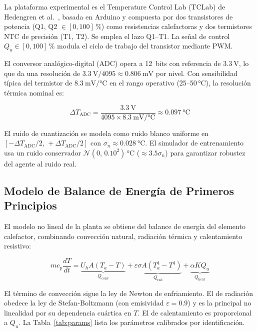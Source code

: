 \documentclass[processes,article,submit,moreauthors,pdftex]{Definitions/mdpi}
\newcommand{\Qu}{Q_u}
\begin{document}
La plataforma experimental es el Temperature Control Lab (TCLab) de
Hedengren et al.\ \cite{Hedengren2019}, basada en Arduino y compuesta por
dos transistores de potencia (Q1, Q2 $\in [0, 100]\,\%$) como resistencias
calefactoras y dos termistores NTC de precisión (T1, T2). Se emplea el
lazo Q1--T1. La señal de control $\Qu \in [0, 100]\,\%$ modula el ciclo de
trabajo del transistor mediante PWM.

El conversor analógico-digital (ADC) opera a 12~bits con referencia de
$\SI{3.3}{\V}$, lo que da una resolución de $\SI{3.3}{\V}/4095 \approx
\SI{0.806}{\milli\V}$ por nivel. Con sensibilidad típica del termistor de
$\SI{8.3}{\milli\V\per\celsius}$ en el rango operativo (25--50\,°C), la
resolución térmica nominal es:

\begin{equation}
  \label{eq:adc_resolution}
  \Delta T_{\mathrm{ADC}}
  = \frac{\SI{3.3}{\V}}{4095 \times \SI{8.3}{\milli\V\per\celsius}}
  \approx \SI{0.097}{\celsius}
\end{equation}

El ruido de cuantización se modela como ruido blanco uniforme en
$[-\Delta T_{\mathrm{ADC}}/2,\, +\Delta T_{\mathrm{ADC}}/2]$ con
$\sigma_n \approx \SI{0.028}{\celsius}$. El simulador de entrenamiento usa
un ruido conservador $\mathcal{N}(0,\, 0.10^2)$\,°C ($\approx 3.5\sigma_n$)
para garantizar robustez del agente al ruido real.

\subsection{Modelo de Balance de Energía de Primeros Principios}
\label{subsec:modeling}

El modelo no lineal de la planta se obtiene del balance de energía del
elemento calefactor, combinando convección natural, radiación térmica y
calentamiento resistivo:

\begin{equation}
  \label{eq:energy_balance}
  m c_p \frac{dT}{dt}
  = \underbrace{U_h A (T_a - T)}_{Q_{\mathrm{conv}}}
  + \underbrace{\varepsilon \sigma A (T_a^4 - T^4)}_{Q_{\mathrm{rad}}}
  + \underbrace{\alpha K \Qu}_{Q_{\mathrm{heat}}}
\end{equation}

El término de convección sigue la ley de Newton de enfriamiento. El de
radiación obedece la ley de Stefan-Boltzmann (con emisividad $\varepsilon
= 0.9$) y es la principal no linealidad por su dependencia cuártica
en $T$. El de calentamiento es proporcional a $\Qu$. La
Tabla~\ref{tab:params} lista los parámetros calibrados por identificación.
\end{document}
